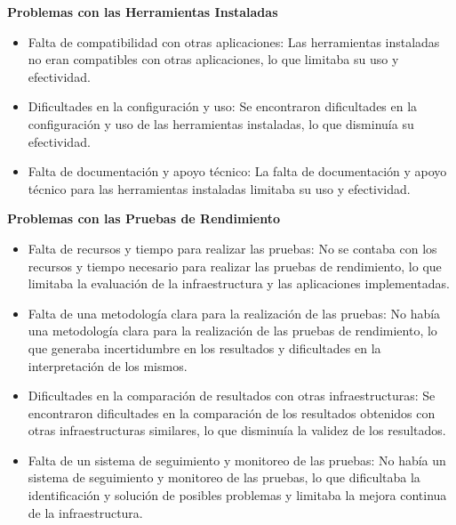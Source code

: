 \begin{doublespace}
\begin{multicols}{2}
    \textbf{Problemas con las Herramientas Instaladas}

    \begin{itemize}
        \item Falta de compatibilidad con otras aplicaciones: Las herramientas instaladas no eran compatibles con otras aplicaciones, lo que limitaba su uso y efectividad.
        \item Dificultades en la configuración y uso: Se encontraron dificultades en la configuración y uso de las herramientas instaladas, lo que disminuía su efectividad.
        \item Falta de documentación y apoyo técnico: La falta de documentación y apoyo técnico para las herramientas instaladas limitaba su uso y efectividad.
    \end{itemize}

    \textbf{Problemas con las Pruebas de Rendimiento}

    \begin{itemize}
        \item Falta de recursos y tiempo para realizar las pruebas: No se contaba con los recursos y tiempo necesario para realizar las pruebas de rendimiento, lo que limitaba la evaluación de la infraestructura y las aplicaciones implementadas.
        \item Falta de una metodología clara para la realización de las pruebas: No había una metodología clara para la realización de las pruebas de rendimiento, lo que generaba incertidumbre en los resultados y dificultades en la interpretación de los mismos.
        \item Dificultades en la comparación de resultados con otras infraestructuras: Se encontraron dificultades en la comparación de los resultados obtenidos con otras infraestructuras similares, lo que disminuía la validez de los resultados.
        \item Falta de un sistema de seguimiento y monitoreo de las pruebas: No había un sistema de seguimiento y monitoreo de las pruebas, lo que dificultaba la identificación y solución de posibles problemas y limitaba la mejora continua de la infraestructura.
    \end{itemize}

\end{multicols}

\mylinespacing
\mylinespacing
\begin{tightcenter}
\end{tightcenter}
\end{doublespace}

